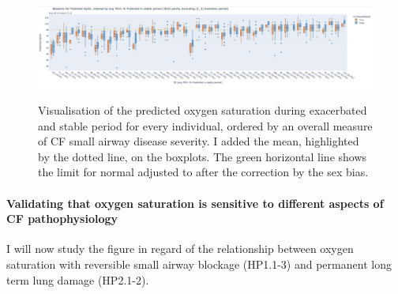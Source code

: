 \begin{figure}[!h]
    \caption{Visualisation of the predicted oxygen saturation during exacerbated and stable period for every individual, ordered by an overall measure of CF small airway disease severity. I added the mean, highlighted by the dotted line, on the boxplots. The green horizontal line shows the limit for normal \SP adjusted to after the correction by the sex bias.}
    \centering
    \includegraphics[width=150mm]{Chapter1/Figs/o2sat_boxplots_smartcare.png}
    \label{fig:o2sat_boxplots_smartcare}
\end{figure}

\paragraph{Validating that oxygen saturation is sensitive to different aspects of CF pathophysiology}
I will now study the figure in regard of the relationship between oxygen saturation with reversible small airway blockage (HP1.1-3) and permanent long term lung damage (HP2.1-2).

